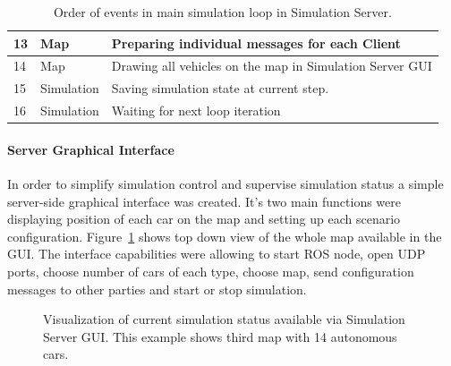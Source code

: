 \documentclass[11pt,english]{article}
\begin{document}
\begin{table}[]
\begin{tabular}{|l|p{2cm}|p{11cm}|}
13        & Map                                 & Preparing individual messages for each Client                                                          \\ \hline
14        & Map                                 & Drawing all vehicles on the map in Simulation Server GUI                                               \\ \hline
15        & Simulation                          & Saving simulation state at current step.                                                               \\ \hline
16        & Simulation                          & Waiting for next loop iteration                                                                        \\ \hline
\end{tabular}
\caption{Order of events in main simulation loop in Simulation Server.}
\label{table:order_server}
\end{table}


\paragraph{Server Graphical Interface}


In order to simplify simulation control and supervise simulation status a simple server-side graphical interface was created. It's two main functions were displaying position of each car on the map and setting up each scenario configuration. Figure~\ref{fig:master_gui_small} shows top down view of the whole map available in the GUI. The interface capabilities were allowing to start ROS node, open UDP ports, choose number of cars of each type, choose map, send configuration messages to other parties and start or stop simulation. 

\begin{figure}[!] %
\caption{Visualization of current simulation status available via Simulation Server GUI. This example shows third map with 14 autonomous cars.}
\label{fig:master_gui_small}
\end{figure} 
\end{document}
